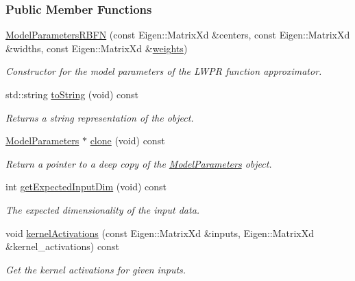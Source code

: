 \subsubsection*{Public Member Functions}
\begin{DoxyCompactItemize}
\item 
\hyperlink{classDmpBbo_1_1ModelParametersRBFN_a42878dcce6da0b2f6d477fd0685b978b}{Model\+Parameters\+R\+B\+F\+N} (const Eigen\+::\+Matrix\+Xd \&centers, const Eigen\+::\+Matrix\+Xd \&widths, const Eigen\+::\+Matrix\+Xd \&\hyperlink{classDmpBbo_1_1ModelParametersRBFN_ab0065893578a0770652450ebfe930481}{weights})
\begin{DoxyCompactList}\small\item\em Constructor for the model parameters of the L\+W\+P\+R function approximator. \end{DoxyCompactList}\item 
std\+::string \hyperlink{classDmpBbo_1_1ModelParametersRBFN_a1aca816b42cf0d36118be0ab91120d77}{to\+String} (void) const 
\begin{DoxyCompactList}\small\item\em Returns a string representation of the object. \end{DoxyCompactList}\item 
\hyperlink{classDmpBbo_1_1ModelParameters}{Model\+Parameters} $\ast$ \hyperlink{classDmpBbo_1_1ModelParametersRBFN_a0a71d403a2e0560e058c03394648d773}{clone} (void) const 
\begin{DoxyCompactList}\small\item\em Return a pointer to a deep copy of the \hyperlink{classDmpBbo_1_1ModelParameters}{Model\+Parameters} object. \end{DoxyCompactList}\item 
int \hyperlink{classDmpBbo_1_1ModelParametersRBFN_af5a550bcf65d5a29a153a594cc4e3fa1}{get\+Expected\+Input\+Dim} (void) const 
\begin{DoxyCompactList}\small\item\em The expected dimensionality of the input data. \end{DoxyCompactList}\item 
void \hyperlink{classDmpBbo_1_1ModelParametersRBFN_a125cc60559b55f7348beb15f25834b6f}{kernel\+Activations} (const Eigen\+::\+Matrix\+Xd \&inputs, Eigen\+::\+Matrix\+Xd \&kernel\+\_\+activations) const 
\begin{DoxyCompactList}\small\item\em Get the kernel activations for given inputs. \end{DoxyCompactList}\item 

\end{DoxyCompactItemize}
